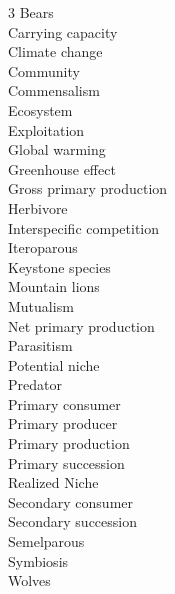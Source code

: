 
\begin{multicols}{3}
Bears \\
Carrying capacity \\
Climate change \\
Community \\
Commensalism \\
Ecosystem \\
Exploitation \\
Global warming \\
Greenhouse effect \\
Gross primary production \\
Herbivore \\
Interspecific competition \\
Iteroparous \\
Keystone species \\
Mountain lions \\
Mutualism \\
Net primary production \\
Parasitism \\
Potential niche \\
Predator \\
Primary consumer \\
Primary producer \\
Primary production \\
Primary succession \\
Realized Niche \\
Secondary consumer \\
Secondary succession \\
Semelparous \\
Symbiosis \\
Wolves 
\end{multicols}

